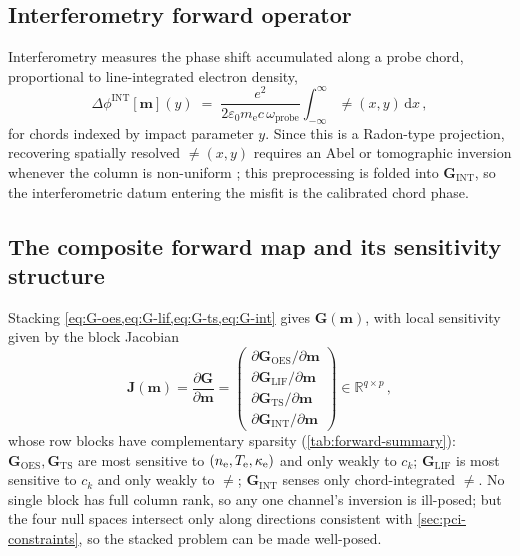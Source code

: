 \subsection{Interferometry forward operator}

Interferometry measures the phase shift accumulated along a probe chord, proportional to line-integrated electron density,
\begin{equation}
\Delta\phi^{\mathrm{INT}}[\mathbf m](y) \;=\; \frac{e^{2}}{2\varepsilon_{0} m_{\mathrm e} c\,\omega_{\mathrm{probe}}}\int_{-\infty}^{\infty} \ne(x,y)\,\mathrm dx \, , \label{eq:G-int}
\end{equation}
for chords indexed by impact parameter $y$. Since this is a Radon-type projection, recovering spatially resolved $\ne(x,y)$ requires an Abel or tomographic inversion whenever the column is non-uniform \cite{ref0399}; this preprocessing is folded into $\mathbf G_{\mathrm{INT}}$, so the interferometric datum entering the misfit is the calibrated chord phase.

\subsection{The composite forward map and its sensitivity structure}

Stacking \cref{eq:G-oes,eq:G-lif,eq:G-ts,eq:G-int} gives $\mathbf G(\mathbf m)$, with local sensitivity given by the block Jacobian
\begin{equation}
\mathbf J(\mathbf m) = \frac{\partial \mathbf G}{\partial \mathbf m} = \begin{pmatrix} \partial \mathbf G_{\mathrm{OES}}/\partial \mathbf m \\ \partial \mathbf G_{\mathrm{LIF}}/\partial \mathbf m \\ \partial \mathbf G_{\mathrm{TS}}/\partial \mathbf m \\ \partial \mathbf G_{\mathrm{INT}}/\partial \mathbf m \end{pmatrix} \in \mathbb R^{q\times p} \, , \label{ch15-eq:jacobian}
\end{equation}
whose row blocks have complementary sparsity (\cref{tab:forward-summary}): $\mathbf G_{\mathrm{OES}},\mathbf G_{\mathrm{TS}}$ are most sensitive to $(n_{\mathrm{e}},T_{\mathrm{e}},\kappa_{\mathrm e})$ and only weakly to $c_{k}$; $\mathbf G_{\mathrm{LIF}}$ is most sensitive to $c_{k}$ and only weakly to $\ne$; $\mathbf G_{\mathrm{INT}}$ senses only chord-integrated $\ne$. No single block has full column rank, so any one channel's inversion is ill-posed; but the four null spaces intersect only along directions consistent with \cref{sec:pci-constraints}, so the stacked problem can be made well-posed.

